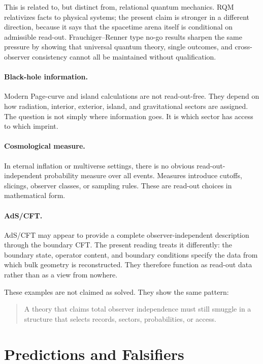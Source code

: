 \documentclass[12pt,a4paper]{article}
\theoremstyle{definition}
\theoremstyle{remark}
\begin{document}
This is related to, but distinct from, relational quantum mechanics. RQM relativizes facts to physical systems; the present claim is stronger in a different direction, because it says that the spacetime arena itself is conditional on admissible read-out. Frauchiger--Renner type no-go results sharpen the same pressure by showing that universal quantum theory, single outcomes, and cross-observer consistency cannot all be maintained without qualification.

\paragraph{Black-hole information.}
Modern Page-curve and island calculations are not read-out-free. They depend on how radiation, interior, exterior, island, and gravitational sectors are assigned. The question is not simply where information goes. It is which sector has access to which imprint.

\paragraph{Cosmological measure.}
In eternal inflation or multiverse settings, there is no obvious read-out-independent probability measure over all events. Measures introduce cutoffs, slicings, observer classes, or sampling rules. These are read-out choices in mathematical form.

\paragraph{AdS/CFT.}
AdS/CFT may appear to provide a complete observer-independent description through the boundary CFT. The present reading treats it differently: the boundary state, operator content, and boundary conditions specify the data from which bulk geometry is reconstructed. They therefore function as read-out data rather than as a view from nowhere.

These examples are not claimed as solved. They show the same pattern:

\begin{quote}
A theory that claims total observer independence must still smuggle in a structure that selects records, sectors, probabilities, or access.
\end{quote}

\section{Predictions and Falsifiers}
\label{sec:predictions}
\end{document}
